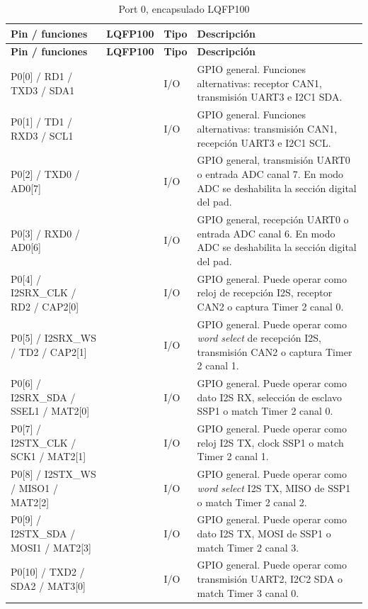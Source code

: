﻿\documentclass[11pt]{article}
\begin{document}
\begin{longtable}{|>{\raggedright\arraybackslash}p{}|>{\raggedright\arraybackslash}p{}|>{\raggedright\arraybackslash}p{}|>{\raggedright\arraybackslash}p{}|}
\caption{Port 0, encapsulado LQFP100}\\
\hline
\textbf{Pin / funciones} & \textbf{LQFP100} & \textbf{Tipo} & \textbf{Descripción} \\
\hline
\endfirsthead
\hline
\textbf{Pin / funciones} & \textbf{LQFP100} & \textbf{Tipo} & \textbf{Descripción} \\
\hline
\endhead
P0[0] / RD1 / TXD3 / SDA1 & 46 & I/O & GPIO general. Funciones alternativas: receptor CAN1, transmisión UART3 e I2C1 SDA. \\
\hline
P0[1] / TD1 / RXD3 / SCL1 & 47 & I/O & GPIO general. Funciones alternativas: transmisión CAN1, recepción UART3 e I2C1 SCL. \\
\hline
P0[2] / TXD0 / AD0[7] & 98 & I/O & GPIO general, transmisión UART0 o entrada ADC canal 7. En modo ADC se deshabilita la sección digital del pad. \\
\hline
P0[3] / RXD0 / AD0[6] & 99 & I/O & GPIO general, recepción UART0 o entrada ADC canal 6. En modo ADC se deshabilita la sección digital del pad. \\
\hline
P0[4] / I2SRX\_CLK / RD2 / CAP2[0] & 81 & I/O & GPIO general. Puede operar como reloj de recepción I2S, receptor CAN2 o captura Timer 2 canal 0. \\
\hline
P0[5] / I2SRX\_WS / TD2 / CAP2[1] & 80 & I/O & GPIO general. Puede operar como \textit{word select} de recepción I2S, transmisión CAN2 o captura Timer 2 canal 1. \\
\hline
P0[6] / I2SRX\_SDA / SSEL1 / MAT2[0] & 79 & I/O & GPIO general. Puede operar como dato I2S RX, selección de esclavo SSP1 o match Timer 2 canal 0. \\
\hline
P0[7] / I2STX\_CLK / SCK1 / MAT2[1] & 78 & I/O & GPIO general. Puede operar como reloj I2S TX, clock SSP1 o match Timer 2 canal 1. \\
\hline
P0[8] / I2STX\_WS / MISO1 / MAT2[2] & 77 & I/O & GPIO general. Puede operar como \textit{word select} I2S TX, MISO de SSP1 o match Timer 2 canal 2. \\
\hline
P0[9] / I2STX\_SDA / MOSI1 / MAT2[3] & 76 & I/O & GPIO general. Puede operar como dato I2S TX, MOSI de SSP1 o match Timer 2 canal 3. \\
\hline
P0[10] / TXD2 / SDA2 / MAT3[0] & 48 & I/O & GPIO general. Puede operar como transmisión UART2, I2C2 SDA o match Timer 3 canal 0. \\

\end{longtable}
\end{document}
